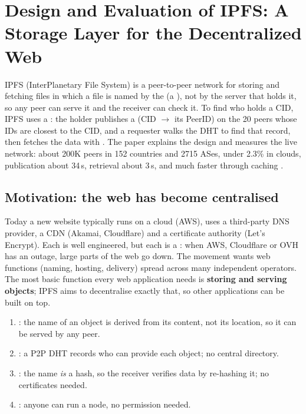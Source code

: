 \chapter{Design and Evaluation of IPFS: A Storage Layer for the Decentralized Web}

\begin{keybox}
IPFS (InterPlanetary File System) is a peer-to-peer network for storing and fetching files in which a file is named by the
 (a ), not by the server that holds it, so any peer can serve it and the receiver can check it.
To find who holds a CID, IPFS uses a : the holder publishes a  (CID $\to$ its PeerID) on the 20
peers whose IDs are closest to the CID, and a requester walks the DHT to find that record, then fetches the data with . The paper
explains the design and measures the live network: about 200K peers in 152 countries and 2715 ASes, under 2.3\% in clouds, publication about 34\,s,
retrieval about 3\,s, and much faster through caching .
\end{keybox}

\section{Motivation: the web has become centralised}

Today a new website typically runs on a cloud (AWS), uses a third-party DNS provider, a CDN (Akamai, Cloudflare) and a certificate authority
(Let's Encrypt). Each is well engineered, but each is a : when AWS, Cloudflare or OVH has an
outage, large parts of the web go down. The  movement wants web functions (naming, hosting, delivery) spread across
many independent operators. The most basic function every web application needs is \textbf{storing and serving objects}; IPFS aims to
decentralise exactly that, so other applications can be built on top.

\begin{keybox}
\begin{enumerate}
  \item {}: the name of an object is derived from its content, not its location, so it can be served by any peer.
  \item {}: a P2P DHT records who can provide each object; no central directory.
  \item {}: the name \emph{is} a hash, so the receiver verifies data by re-hashing it; no certificates needed.
  \item {}: anyone can run a node, no permission needed.
\end{enumerate}
\end{keybox}

